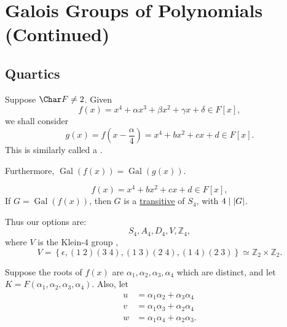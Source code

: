 \documentclass[notoc,notitlepage,nobib]{tufte-book}
\DeclareMathOperator{\Gal}{Gal}
\begin{document}
\section{Galois Groups of Polynomials (Continued)}%
\label{sec:galois_groups_of_polynomials_continued}

\subsection{Quartics}%
\label{sub:quartics}

\begin{defn}\label{defn:depressed_quartic}
  Suppose $\Char F \neq 2$. Given
  \begin{equation*}
    f(x) = x^4 + \alpha x^3 + \beta x^2 + \gamma x + \delta \in F[x],
  \end{equation*}
  we shall consider
  \begin{equation*}
    g(x) = f\left(x - \frac{\alpha}{4}\right) = x^4 + bx^2 + cx + d \in F[x].
  \end{equation*}
  This is similarly called a .
\end{defn}

\begin{note}
  Furthermore, $\Gal(f(x)) = \Gal(g(x))$. 
\end{note}

\begin{equation*}
  f(x) = x^4 + b x^2 + c x + d \in F[x],
\end{equation*}
If $G = \Gal(f(x))$, then $G$ is a
\hyperref[defn:transitive_subgroup]{transitive} of $S_4$, with $4 \mid \left|G\right|$.

Thus our options are:
\begin{equation*}
  S_4, A_4, D_4, V, \mathbb{Z}_4,
\end{equation*}
where $V$ is the Klein-$4$ group ,
\begin{equation*}
  V = \left\{ \epsilon, (1 \; 2)(3 \; 4), (1 \; 3)(2 \; 4), (1\; 4)(2 \; 3)
  \right\} \simeq \mathbb{Z}_2 \times \mathbb{Z}_2.
\end{equation*}

Suppose the roots of $f(x)$ are $\alpha_1, \alpha_2, \alpha_3, \alpha_4$ which
are distinct, and let $K = F(\alpha_1, \alpha_2, \alpha_3, \alpha_4)$. Also,
let
\begin{align*}
  u &= \alpha_1 \alpha_2 + \alpha_3 \alpha_4 \\
  v &= \alpha_1 \alpha_3 + \alpha_2 \alpha_4 \\
  w &= \alpha_1 \alpha_4 + \alpha_2 \alpha_3.
\end{align*}
\end{document}
